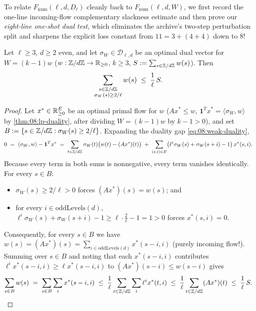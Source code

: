 To relate $F_{\mathrm{num}}(\ell, d, D_\ell)$ cleanly back to $F_{\mathrm{num}}(\ell, d, W)$, we first record the one-line incoming-flow complementary slackness estimate and then prove our \emph{eight-line one-shot dual test}, which eliminates the archive's two-step perturbation split and sharpens the explicit loss constant from $11 = 3 + (4 + 4)$ down to $8$!

\begin{lemma}
\label{lem:08:slackness}
Let $\ell \ge 3$, $d \ge 2$ even, and let $\sigma_W \in \mathcal{D}_{\ell, d}$ be an optimal dual vector for $W = (k - 1)w$ ($w : \mathbb{Z}/d\mathbb{Z} \to \mathbb{R}_{\ge 0}$, $k \ge 3$, $S := \sum_{s \in \mathbb{Z}/d\mathbb{Z}} w(s)$). Then
\begin{equation}
\label{eq:08:slackness}
  \sum_{\substack{s \in \mathbb{Z}/d\mathbb{Z} \\ \sigma_W(s) \ge 2/\ell}} w(s) \;\le\; \frac{1}{\ell}\, S.
\end{equation}
\end{lemma}

\begin{proof}
Let $x^* \in \mathbb{R}_{\ge 0}^E$ be an optimal primal flow for $w$ ($A x^* \le w$, $\mathbf{1}^T x^* = \langle \sigma_W, w \rangle$ by \cref{thm:08:lp-duality}, after dividing $W = (k-1)w$ by $k-1 > 0$), and set $B := \{s \in \mathbb{Z}/d\mathbb{Z} : \sigma_W(s) \ge 2/\ell\}$. Expanding the duality gap \eqref{eq:08:weak-duality},
\[
  0 \;=\; \langle \sigma_W, w \rangle - \mathbf{1}^T x^*
  \;=\; \sum_{t \in \mathbb{Z}/d\mathbb{Z}} \sigma_W(t)\bigl(w(t) - (A x^*)(t)\bigr)
  \;+\; \sum_{(s, i) \in E} \bigl(\ell^i \sigma_W(s) + \sigma_W(s + i) - 1\bigr)\, x^*(s, i).
\]
Because every term in both sums is nonnegative, every term vanishes identically. For every $s \in B$:
\begin{itemize}
\item $\sigma_W(s) \ge 2/\ell > 0$ forces $(A x^*)(s) = w(s)$; and
\item for every $i \in \mathrm{oddLevels}(d)$, $\ell^i \sigma_W(s) + \sigma_W(s + i) - 1 \ge \ell \cdot \frac{2}{\ell} - 1 = 1 > 0$ forces $x^*(s, i) = 0$.
\end{itemize}
Consequently, for every $s \in B$ we have $w(s) = (A x^*)(s) = \sum_{i \in \mathrm{oddLevels}(d)} x^*(s - i, i)$ (purely incoming flow!). Summing over $s \in B$ and noting that each $x^*(s - i, i)$ contributes $\ell^i x^*(s - i, i) \ge \ell x^*(s - i, i)$ to $(A x^*)(s - i) \le w(s - i)$ gives
\[
  \sum_{s \in B} w(s) \;=\; \sum_{s \in B} \sum_{i} x^*(s - i, i)
  \;\le\; \frac{1}{\ell}\sum_{t \in \mathbb{Z}/d\mathbb{Z}}\sum_{i} \ell^i x^*(t, i)
  \;\le\; \frac{1}{\ell}\sum_{t \in \mathbb{Z}/d\mathbb{Z}} (A x^*)(t) \;\le\; \frac{1}{\ell}\, S. \qedhere
\]
\end{proof}

